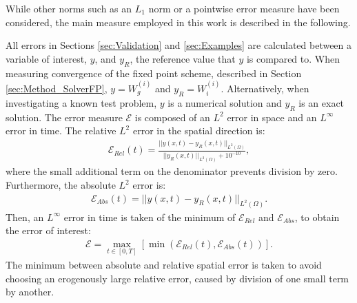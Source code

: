 While other norms such as an $L_1$ norm or a pointwise error measure have been considered, the main measure employed in this work is described in the following.

All errors in Sections \ref{sec:Validation} and \ref{sec:Examples} are calculated between a variable of interest, $y$, and $y_R$, the reference value that $y$ is compared to. When measuring convergence of the fixed point scheme, described in Section \ref{sec:Method_SolverFP}, $y = W^{(i)}_g$ and $y_R = W^{(i)}_i$. Alternatively, when investigating a known test problem, $y$ is a numerical solution and $y_R$ is an exact solution. The error measure $\mathcal{E}$ is composed of an $L^2$ error in space and an $L^\infty$ error in time. The relative $L^2$ error in the spatial direction is:
\begin{align*}
\mathcal{E}_{Rel}(t) = \frac{|| y(x,t) - y_{R}(x,t)||_{L^2(\Omega)} }{||y_R(x,t) ||_{L^2(\Omega)}+ 10^{-10}},
\end{align*}
where the small additional term on the denominator prevents division by zero.
Furthermore, the absolute $L^2$ error is:
\begin{align*}
\mathcal{E}_{Abs}(t) = || y(x,t) - y_R(x,t)||_{L^2(\Omega)}.
\end{align*}
Then, an $L^\infty$ error in time is taken of the minimum of $\mathcal{E}_{Rel}$ and $\mathcal{E}_{Abs}$, to obtain the error of interest:
\begin{align*}
\mathcal{E} = \max_{t \in [0,T]}\left[\min\left(\mathcal{E}_{Rel}(t), \mathcal{E}_{Abs}(t)\right)\right].
\end{align*}
The minimum between absolute and relative spatial error is taken to avoid choosing an erogenously large relative error, caused by division of one small term by another.

